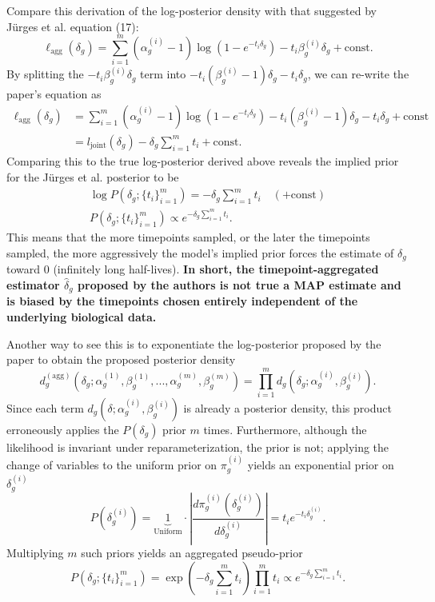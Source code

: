 \documentclass[11pt]{article}
\begin{document}
Compare this derivation of the log-posterior density with that suggested by Jürges et al. equation (17):
$$
\ell_\text{agg}(\delta_g)
= \sum_{i=1}^m (\alpha_g^{(i)} - 1) \log\left(1 - e^{-t_i \delta_g}\right) - t_i \beta_g^{(i)} \delta_g + \text{const}.
$$
By splitting the $-t_i \beta_g^{(i)} \delta_g$ term into $-t_i (\beta_g^{(i)} - 1) \delta_g - t_i \delta_g$, we can re-write the paper's equation as
$$
\begin{aligned}
\ell_\text{agg}(\delta_g)
&= \sum_{i=1}^m (\alpha_g^{(i)} - 1) \log\left(1 - e^{-t_i \delta_g}\right) - t_i (\beta_g^{(i)} - 1) \delta_g - t_i \delta_g + \text{const} \\
&= l_\text{joint}(\delta_g) - \delta_g \sum_{i=1}^m t_i + \text{const}.
\end{aligned}
$$
Comparing this to the true log-posterior derived above reveals the implied prior for the Jürges et al. posterior to be
$$
\begin{gathered}
\log P(\delta_g; \{t_i\}_{i=1}^m) = - \delta_g \sum_{i=1}^m t_i \quad (+ \text{const}) \\
P(\delta_g; \{t_i\}_{i=1}^m) \propto e^{-\delta_g \sum_{i=1}^m t_i}.
\end{gathered}
$$
This means that the more timepoints sampled, or the later the timepoints sampled, the more aggressively the model's implied prior forces the estimate of $\delta_g$ toward $0$ (infinitely long half-lives). \textbf{In short, the timepoint-aggregated estimator $\hat{\delta}_g$ proposed by the authors is not true a MAP estimate and is biased by the timepoints chosen entirely independent of the underlying biological data.}

Another way to see this is to exponentiate the log-posterior proposed by the paper to obtain the proposed posterior density
$$
d_g^{(\text{agg})}(\delta_g; \alpha_g^{(1)}, \beta_g^{(1)}, ..., \alpha_g^{(m)}, \beta_g^{(m)}) = \prod_{i=1}^m d_g(\delta_g; \alpha_g^{(i)}, \beta_g^{(i)}).
$$
Since each term $d_g(\delta; \alpha_g^{(i)}, \beta_g^{(i)})$ is already a posterior density, this product erroneously applies the $P(\delta_g)$ prior $m$ times. Furthermore, although the likelihood is invariant under reparameterization, the prior is not; applying the change of variables to the uniform prior on $\pi_g^{(i)}$ yields an exponential prior on $\delta_g^{(i)}$
$$
P(\delta_g^{(i)})
= \underbrace{1}_{\text{Uniform}} \cdot \left\lvert \frac{d \pi_g^{(i)}(\delta_g^{(i)})}{d \delta_g^{(i)}} \right\rvert
= t_i e^{-t_i \delta_g^{(i)}}.
$$
Multiplying $m$ such priors yields an aggregated pseudo-prior
$$
P(\delta_g; \{t_i\}_{i=1}^m)
= \exp \left(- \delta_g \sum_{i=1}^m t_i \right) \prod_{i=1}^m t_i
\propto e^{- \delta_g \sum_{i=1}^m t_i}.
$$
\end{document}
